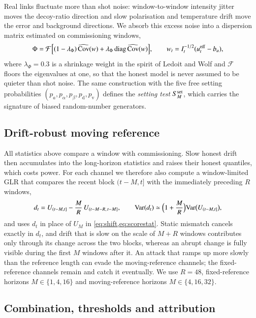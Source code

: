 Real links fluctuate more than shot noise: window-to-window intensity jitter moves the decoy-ratio direction and slow polarisation and temperature drift move the error and background directions. We absorb this excess noise into a dispersion matrix estimated on commissioning windows,
\begin{equation}
\Phi = \mathcal{F}\Bigl[(1-\lambda_\Phi)\,\widehat{\mathrm{Cov}}(w)+\lambda_\Phi\,\mathrm{diag}\,\widehat{\mathrm{Cov}}(w)\Bigr],\qquad w_t=I_t^{-1/2}(u^{\rm eff}_t-b_u), \label{eq:disp}
\end{equation}
where $\lambda_\Phi=0.3$ is a shrinkage weight in the spirit of Ledoit and Wolf \cite{LedoitWolf2004} and $\mathcal{F}$ floors the eigenvalues at one, so that the honest model is never assumed to be quieter than shot noise. The same construction with the five free setting probabilities $(p_a,p_\alpha,p_\beta,p_\mathrm{d},p_\mathrm{v})$ defines the \emph{setting test} $S^{\rm set}_M$, which carries the signature of biased random-number generators.

\subsection{Drift-robust moving reference}\label{sec:moving}

All statistics above compare a window with commissioning. Slow honest drift then accumulates into the long-horizon statistics and raises their honest quantiles, which costs power. For each channel we therefore also compute a window-limited GLR that compares the recent block $(t-M,t]$ with the immediately preceding $R$ windows,
\begin{equation}
d_t = U_{(t-M,t]} - \frac{M}{R}\,U_{(t-M-R,\,t-M]},\qquad \mathrm{Var}(d_t)\simeq\Bigl(1+\frac{M}{R}\Bigr)\mathrm{Var}\bigl(U_{(t-M,t]}\bigr), \label{eq:moving}
\end{equation}
and uses $d_t$ in place of $U_M$ in \cref{eq:shift,eq:scorestat}. Static mismatch cancels exactly in $d_t$, and drift that is slow on the scale of $M+R$ windows contributes only through its change across the two blocks, whereas an abrupt change is fully visible during the first $M$ windows after it. An attack that ramps up more slowly than the reference length can evade the moving-reference channels; the fixed-reference channels remain and catch it eventually. We use $R=48$, fixed-reference horizons $M\in\{1,4,16\}$ and moving-reference horizons $M\in\{4,16,32\}$.

\subsection{Combination, thresholds and attribution}\label{sec:combine}


